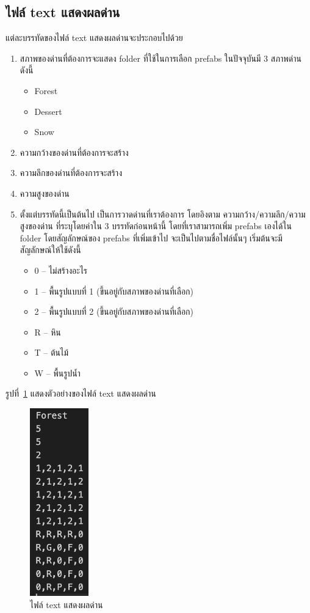 \subsection{ไฟล์ text แสดงผลด่าน}
แต่ละบรรทัดของไฟล์ text แสดงผลด่านจะประกอบไปด้วย
\begin{enumerate}
    \item สภาพของด่านที่ต้องการจะแสดง folder ที่ใช้ในการเลือก prefabs ในปัจจุบันมี 3 สภาพด่าน ดังนี้
    \begin{itemize}
        \item Forest
        \item Dessert
        \item Snow
    \end{itemize}
    \item ความกว้างของด่านที่ต้องการจะสร้าง
    \item ความลึกของด่านที่ต้องการจะสร้าง
    \item ความสูงของด่าน
    \item ตั้งแต่บรรทัดนี้เป็นต้นไป เป็นการวาดด่านที่เราต้องการ โดยอิงตาม ความกว้าง/ความลึก/ความสูงของด่าน ที่ระบุโดยค่าใน 3 บรรทัดก่อนหน้านี้ โดยที่เราสามารถเพิ่ม prefabs เองได้ใน folder  โดยสัญลักษณ์ของ prefabs ที่เพิ่มเข้าไป จะเป็นไปตามชื่อไฟล์นั้นๆ เริ่มต้นจะมีสัญลักษณ์ให้ใช้ดังนี้
    \begin{itemize}
        \item 0 -- ไม่สร้างอะไร
        \item 1 -- พื้นรูปแบบที่ 1 (ขึ้นอยู่กับสภาพของด่านที่เลือก)
        \item 2 -- พื้นรูปแบบที่ 2 (ขึ้นอยู่กับสภาพของด่านที่เลือก)
        \item R -- หิน
        \item T -- ต้นไม้
        \item W -- พื้นรูปน้ำ
    \end{itemize}
\end{enumerate}
รูปที่~\ref{ft1} แสดงตัวอย่างของไฟล์ text แสดงผลด่าน
\begin{figure}[H]
    \begin{center}
    \includegraphics[width=1in]{pic-toro/filetext2.png}
    \end{center}
    \caption[ไฟล์ text แสดงผลด่าน]{ไฟล์ text แสดงผลด่าน}
    \label{ft1}
\end{figure}


